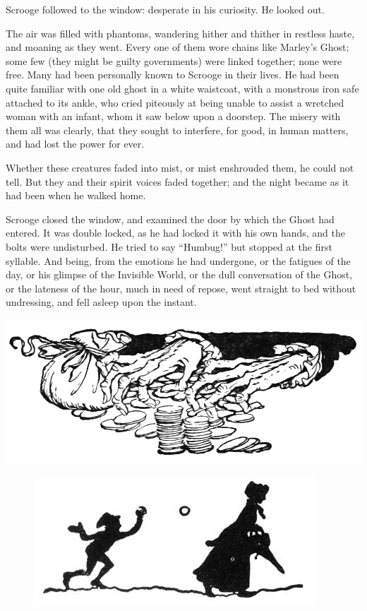 \documentclass[paper=5.5in:8.5in,BCOR=10mm,twoside,DIV=15,12pt,usegeometry,openany]{scrbook} %
\begin{document}
Scrooge followed to the window: desperate in his curiosity. He looked out.

The air was filled with phantoms, wandering hither and thither in restless haste, and moaning as they went. Every one of them wore chains like Marley's Ghost; some few (they might be guilty governments) were linked together; none were free. Many had been personally known to Scrooge in their lives. He had been quite familiar with one old ghost in a white waistcoat, with a monstrous iron safe attached to its ankle, who cried piteously at being unable to assist a wretched woman with an infant, whom it saw below upon a doorstep. The misery with them all was clearly, that they sought to interfere, for good, in human matters, and had lost the power for ever.

Whether these creatures faded into mist, or mist enshrouded them, he could not tell. But they and their spirit voices faded together; and the night became as it had been when he walked home.

Scrooge closed the window, and examined the door by which the Ghost had entered. It was double locked, as he had locked it with his own hands, and the bolts were undisturbed. He tried to say \enquote{Humbug!} but stopped at the first syllable. And being, from the emotions he had undergone, or the fatigues of the day, or his glimpse of the Invisible World, or the dull conversation of the Ghost, or the lateness of the hour, much in need of repose, went straight to bed without undressing, and fell asleep upon the instant.

\begin{minipage}[c]{\linewidth}
\includegraphics[width=\linewidth]{handsmoney}
\end{minipage}


\begin{figure}[h]
\centering
\includegraphics[width=.5\linewidth]{gs012}
\end{figure}
\end{document}
